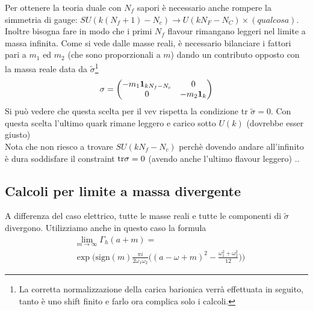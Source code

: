 \documentclass[a4paper,12pt]{article}
\begin{document}
Per ottenere la teoria duale con $N_f$ sapori è necessario anche rompere la simmetria di gauge: $SU(k(N_f+1) -N_c) \rightarrow U( k N_F - N_C) \times (qualcosa)$. Inoltre bisogna fare in modo che i primi $N_f$ flavour rimangano leggeri nel limite a massa infinita. Come si vede dalle masse reali, è necessario bilanciare i fattori pari a $m_1$ ed $m_2$ (che sono proporzionali a $m$) dando un contributo opposto con la massa reale data da $\tilde{\sigma}$\footnote{La corretta normalizzazione della carica barionica verrà effettuata in seguito, tanto è uno shift finito e farlo ora complica solo i calcoli.}
\begin{equation}
 \sigma =
 \begin{pmatrix}
  - m_1 \bold{ 1}_{ k N_f - N_c} & 0 \\
  0 &  - m_2 \bold{ 1}_{k}
 \end{pmatrix}
\end{equation}
Si può vedere che questa scelta per il vev rispetta la condizione tr $\tilde{\sigma} = 0$.
Con questa scelta l'ultimo quark rimane leggero e carico sotto $U(k)$ (dovrebbe esser giusto)\\
Nota che non riesco a trovare $SU( k N_f - N_c)$ perchè dovendo andare all'infinito è dura soddisfare il constraint $ \hbox{tr} \sigma = 0$ (avendo anche l'ultimo flavour leggero) ..
\subsection{Calcoli per limite a massa divergente}
A differenza del caso elettrico, tutte le masse reali e tutte le componenti di $\tilde{\sigma}$ divergono.
Utilizziamo anche in questo caso la formula
\begin{align}
&\lim_{ m \rightarrow \infty } \Gamma_h ( a +  m) = \\
& \exp \bigg( \mbox{sign} (m) \frac{\pi i }{2 \omega_1 \omega_2} \bigg( ( a - \omega + m)^2 - \frac{\omega_1^2 + \omega_2^2}{12} \bigg) \bigg)
\label{eqn:gamma_lim_m}
\end{align}
\end{document}
